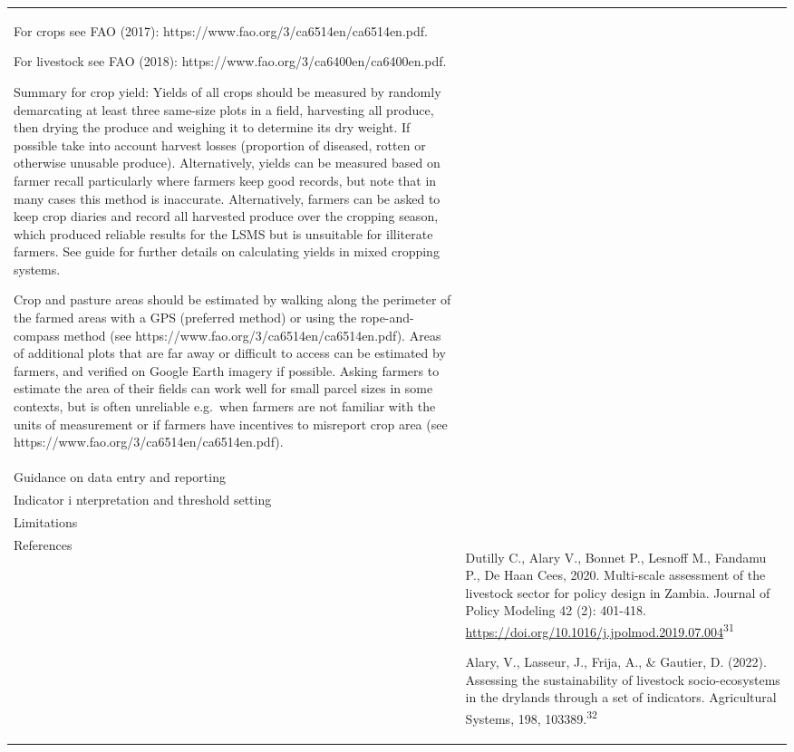 \documentclass[
  letterpaper,
  DIV=11,
  numbers=noendperiod]{scrreprt}
\begin{document}
\begin{longtable}[]{@{}
  >{\raggedright\arraybackslash}p{}
  >{\raggedright\arraybackslash}p{}@{}}
\begin{minipage}[t]{\linewidth}
For crops see FAO (2017): https://www.fao.org/3/ca6514en/ca6514en.pdf.

For livestock see FAO (2018):
https://www.fao.org/3/ca6400en/ca6400en.pdf.

Summary for crop yield: Yields of all crops should be measured by
randomly demarcating at least three same-size plots in a field,
harvesting all produce, then drying the produce and weighing it to
determine its dry weight. If possible take into account harvest losses
(proportion of diseased, rotten or otherwise unusable produce).
Alternatively, yields can be measured based on farmer recall
particularly where farmers keep good records, but note that in many
cases this method is inaccurate. Alternatively, farmers can be asked to
keep crop diaries and record all harvested produce over the cropping
season, which produced reliable results for the LSMS but is unsuitable
for illiterate farmers. See guide for further details on calculating
yields in mixed cropping systems.

Crop and pasture areas should be estimated by walking along the
perimeter of the farmed areas with a GPS (preferred method) or using the
rope-and-compass method (see
https://www.fao.org/3/ca6514en/ca6514en.pdf). Areas of additional plots
that are far away or difficult to access can be estimated by farmers,
and verified on Google Earth imagery if possible. Asking farmers to
estimate the area of their fields can work well for small parcel sizes
in some contexts, but is often unreliable e.g.~when farmers are not
familiar with the units of measurement or if farmers have incentives to
misreport crop area (see
https://www.fao.org/3/ca6514en/ca6514en.pdf).\strut
\end{minipage} \\
Guidance on data entry and reporting & \\
Indicator i nterpretation and threshold setting & \\
Limitations & \\
References & Dutilly C., Alary V., Bonnet P., Lesnoff M., Fandamu P., De
Haan Cees, 2020. Multi-scale assessment of the livestock sector for
policy design in Zambia. Journal of Policy Modeling 42 (2): 401-418.
\url{https://doi.org/10.1016/j.jpolmod.2019.07.004}\textsuperscript{31}

Alary, V., Lasseur, J., Frija, A., \& Gautier, D. (2022). Assessing the
sustainability of livestock socio-ecosystems in the drylands through a
set of indicators. Agricultural Systems, 198,
103389.\textsuperscript{32} \\
\end{longtable}
\end{document}

